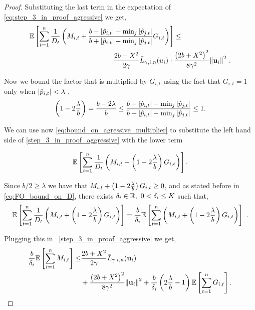 {\begin{proof}
\noindent
Substituting the last term in the expectation of
\eqref{eq:step_3_in_proof_agressive} we get,
\begin{equation}
\begin{split}
\mathbb{E}\left[ \sum_{t=1}^{n}{\frac{1}{D_{t}}}\left({M_{i,t}+\frac{b-\left\vert{\hat{p}_{i,t}}\right\vert-\min_{j}{\left\vert{\hat{p}_{j,t}}\right\vert }}{b+\left\vert{\hat{p}_{i,t}}\right\vert-\min_{j}{\left\vert{\hat{p}_{j,t}}\right\vert}}G_{i,t} }\right) \right]
&\le \\ \frac{2b+X^2}{2\gamma}{\bar
  L}_{\gamma,i,n}(u_i)+&\frac{\left({2b+X^2}\right)^2}{8{\gamma}^2}{\left\Vert
    \mathbf{u}_{i} \right\Vert}^2~.
\label{step_3_in_proof_aggressive}
\end{split}
\end{equation} 

\noindent
Now we bound the factor that is multiplied by $G_{i,t}$ using the fact that $G_{i,t}=1$ only when 
$\left\vert{\hat{p}_{i,t}}\right\vert<\lambda$ ,
\begin{equation}
\label{eq:bound_on_agressive_multiplier}
\left({1-2\frac{\lambda}{b}}\right)=\frac{b-2\lambda}{b} \le\frac{b-\left\vert{\hat{p}_{i,t}}\right\vert-\min_{j}{\left\vert{\hat{p}_{j,t}}\right\vert }}{b+\left\vert{\hat{p}_{i,t}}\right\vert-\min_{j}{\left\vert{\hat{p}_{j,t}}\right\vert}}\le1.
\end{equation}

\noindent
We can use now \eqref{eq:bound_on_agressive_multiplier} to substitute the left hand 
side of \eqref{step_3_in_proof_aggressive} with the lower term

\begin{equation*}
\mathbb{E}\left[{
  \sum_{t=1}^{n}{\frac{1}{D_{t}}}\left({M_{i,t}+\left({1-2\frac{\lambda}{b}}\right)G_{i,t}}\right)}\right].
\end{equation*}

\noindent
Since $b/2 \geq \lambda$ we have that
$M_{i,t}+\left({1-2\frac{\lambda}{b}}\right)G_{i,t}\geq 0$,  and as stated before in \eqref{eq:FO_bound_on_D}, 
there exists $\delta_i\in\mathbb{R},~ 0<\delta_i\le K$ such that, 
\begin{equation*}
\mathbb{E}\left[
  \sum_{t=1}^{n}{\frac{1}{D_{t}}}\left({M_{i,t}+\left({1-2\frac{\lambda}{b}}\right)G_{i,t}
  }\right) \right]=\frac{b}{\delta_i}\mathbb{E}\left[
  \sum_{t=1}^{n}\left({M_{i,t}+\left({1-2\frac{\lambda}{b}}\right)G_{i,t}
  }\right) \right] ~.
\end{equation*}

\noindent
Plugging this in ~\eqref{step_3_in_proof_aggressive} we get,
\begin{equation*}
\begin{split}
\frac{b}{\delta_i}\mathbb{E}\left[{\sum_{t=1}^{n}{M_{i,t}}}\right]
\le& \frac{2b+X^2}{2\gamma}{\bar L}_{\gamma,i,n}(\mathbf{u}_{i})\\
&+\frac{\left({2b+X^2}\right)^2}{8{\gamma}^2}{\left\Vert \mathbf{u}_{i} \right\Vert}^2+ 
     \frac{b}{\delta_i}\left({2\frac{\lambda}{b}-1}\right)\mathbb{E}\left[{\sum_{t=1}^{n}{G_{i,t}}}\right].
\end{split}
\end{equation*}


\end{proof}}
